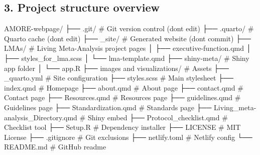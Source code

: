 \documentclass[
  letterpaper,
  DIV=11,
  numbers=noendperiod]{scrartcl}
\newenvironment{Shaded}{\begin{snugshade}}{\end{snugshade}}
\newcommand{\CommentTok}[1]{\textcolor[rgb]{0.37,0.37,0.37}{#1}}
\newcommand{\ExtensionTok}[1]{\textcolor[rgb]{0.00,0.23,0.31}{#1}}
\newcommand{\NormalTok}[1]{\textcolor[rgb]{0.00,0.23,0.31}{#1}}
\begin{document}
\subsection{3. Project structure
overview}\label{project-structure-overview}

\begin{Shaded}
\begin{Highlighting}[]


\ExtensionTok{AMORE{-}webpage/}
\ExtensionTok{├──}\NormalTok{ .git/                      }\CommentTok{\# Git version control (don\textquotesingle{}t edit)}
\ExtensionTok{├──}\NormalTok{ .quarto/                   }\CommentTok{\# Quarto cache (don\textquotesingle{}t edit)}
\ExtensionTok{├──}\NormalTok{ \_site/                     }\CommentTok{\# Generated website (don\textquotesingle{}t commit)}
\ExtensionTok{├──}\NormalTok{ LMAs/                      }\CommentTok{\# Living Meta{-}Analysis project pages}
\ExtensionTok{│}\NormalTok{   ├── executive{-}function.qmd}
\ExtensionTok{│}\NormalTok{   ├── styles\_for\_lma.scss}
\ExtensionTok{│}\NormalTok{   └── lma{-}template.qmd}
\ExtensionTok{├──}\NormalTok{ shiny{-}meta/               }\CommentTok{\# Shiny app folder}
\ExtensionTok{│}\NormalTok{   └── app.R}
\ExtensionTok{├──}\NormalTok{ images and visualizations/ }\CommentTok{\# Assets}
\ExtensionTok{├──}\NormalTok{ \_quarto.yml               }\CommentTok{\# Site configuration}
\ExtensionTok{├──}\NormalTok{ styles.scss               }\CommentTok{\# Main stylesheet}
\ExtensionTok{├──}\NormalTok{ index.qmd                 }\CommentTok{\# Homepage}
\ExtensionTok{├──}\NormalTok{ about.qmd                 }\CommentTok{\# About page}
\ExtensionTok{├──}\NormalTok{ contact.qmd               }\CommentTok{\# Contact page}
\ExtensionTok{├──}\NormalTok{ Resources.qmd             }\CommentTok{\# Resources page}
\ExtensionTok{├──}\NormalTok{ guidelines.qmd            }\CommentTok{\# Guidelines page}
\ExtensionTok{├──}\NormalTok{ Standardization.qmd       }\CommentTok{\# Standards page}
\ExtensionTok{├──}\NormalTok{ Living\_meta{-}analysis\_Directory.qmd  }\CommentTok{\# Shiny embed}
\ExtensionTok{├──}\NormalTok{ Protocol\_checklist.qmd    }\CommentTok{\# Checklist tool}
\ExtensionTok{├──}\NormalTok{ Setup.R                   }\CommentTok{\# Dependency installer}
\ExtensionTok{├──}\NormalTok{ LICENSE                   }\CommentTok{\# MIT License}
\ExtensionTok{├──}\NormalTok{ .gitignore               }\CommentTok{\# Git exclusions}
\ExtensionTok{├──}\NormalTok{ netlify.toml             }\CommentTok{\# Netlify config}
\ExtensionTok{└──}\NormalTok{ README.md                }\CommentTok{\# GitHub readme}
\end{Highlighting}
\end{Shaded}
\end{document}
